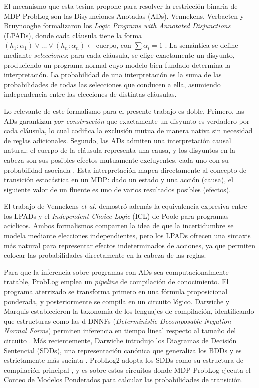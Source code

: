 El mecanismo que esta tesina propone para resolver la restricción binaria de MDP-ProbLog son las Disyunciones Anotadas (ADs). Vennekens, Verbaeten y Bruynooghe formalizaron los \textit{Logic Programs with Annotated Disjunctions} (LPADs), donde cada cláusula tiene la forma $(h_1:\alpha_1) \vee \ldots \vee (h_n:\alpha_n) \leftarrow \text{cuerpo}$, con $\sum \alpha_i = 1$ \cite{vennekens2004lpads}. La semántica se define mediante \textit{selecciones}: para cada cláusula, se elige exactamente un disyunto, produciendo un programa normal cuyo modelo bien fundado determina la interpretación. La probabilidad de una interpretación es la suma de las probabilidades de todas las selecciones que conducen a ella, asumiendo independencia entre las elecciones de distintas cláusulas.

Lo relevante de este formalismo para el presente trabajo es doble. Primero, las ADs garantizan \textit{por construcción} que exactamente un disyunto es verdadero por cada cláusula, lo cual codifica la exclusión mutua de manera nativa sin necesidad de reglas adicionales. Segundo, las ADs admiten una interpretación causal natural: el cuerpo de la cláusula representa una causa, y los disyuntos en la cabeza son sus posibles efectos mutuamente excluyentes, cada uno con su probabilidad asociada \cite{vennekens2009cplogic}. Esta interpretación mapea directamente al concepto de transición estocástica en un MDP: dado un estado y una acción (causa), el siguiente valor de un fluente es uno de varios resultados posibles (efectos).

El trabajo de Vennekens \textit{et al.} demostró además la equivalencia expresiva entre los LPADs y el \textit{Independent Choice Logic} (ICL) de Poole \cite{poole1997independent} para programas acíclicos. Ambos formalismos comparten la idea de que la incertidumbre se modela mediante elecciones independientes, pero los LPADs ofrecen una sintaxis más natural para representar efectos indeterminados de acciones, ya que permiten colocar las probabilidades directamente en la cabeza de las reglas.

Para que la inferencia sobre programas con ADs sea computacionalmente tratable, ProbLog emplea un \textit{pipeline} de compilación de conocimiento. El programa aterrizado se transforma primero en una fórmula proposicional ponderada, y posteriormente se compila en un circuito lógico. Darwiche y Marquis establecieron la taxonomía de los lenguajes de compilación, identificando que estructuras como las d-DNNFs (\textit{Deterministic Decomposable Negation Normal Forms}) permiten inferencia en tiempo lineal respecto al tamaño del circuito \cite{darwiche2002knowledge}. Más recientemente, Darwiche introdujo los Diagramas de Decisión Sentencial (SDDs), una representación canónica que generaliza los BDDs y es estrictamente más sucinta \cite{darwiche2011sdd}. ProbLog2 adopta los SDDs como su estructura de compilación principal \cite{vlasselaer2016problog2}, y es sobre estos circuitos donde MDP-ProbLog ejecuta el Conteo de Modelos Ponderados para calcular las probabilidades de transición.

